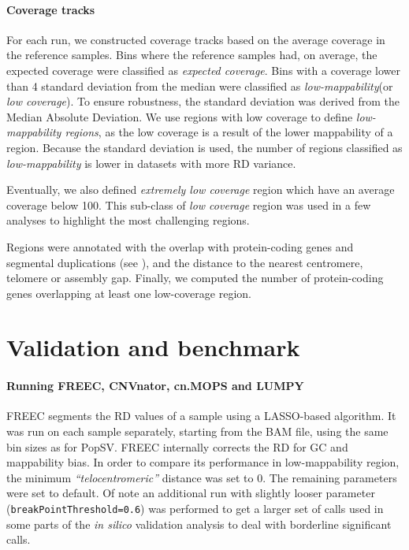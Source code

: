 \paragraph{Coverage tracks}
For each run, we constructed coverage tracks based on the average coverage in the reference samples.
Bins where the reference samples had, on average, the expected coverage were classified as {\it expected coverage}.
Bins with a coverage lower than 4 standard deviation from the median were classified as {\it low-mappability}(or {\it low coverage}).
To ensure robustness, the standard deviation was derived from the Median Absolute Deviation.
We use regions with low coverage to define {\it low-mappability regions}, as the low coverage is a result of the lower mappability of a region.
Because the standard deviation is used, the number of regions classified as {\it low-mappability} is lower in datasets with more RD variance.

Eventually, we also defined {\it extremely low coverage} region which have an average coverage below 100.
This sub-class of {\it low coverage} region was used in a few analyses to highlight the most challenging regions.

Regions were annotated with the overlap with protein-coding genes and segmental duplications (see ), and the distance to the nearest centromere, telomere or assembly gap.
Finally, we computed the number of protein-coding genes overlapping at least one low-coverage region.

\section*{Validation and benchmark}

\paragraph{Running {\sf FREEC}, {\sf CNVnator}, {\sf cn.MOPS} and {\sf LUMPY}}
{\sf FREEC}\cite{Boeva2011} segments the RD values of a sample using a LASSO-based algorithm.
It was run on each sample separately, starting from the BAM file, using the same bin sizes as for {\sf PopSV}.
{\sf FREEC} internally corrects the RD for GC and mappability bias.
In order to compare its performance in low-mappability region, the minimum {\it ``telocentromeric''} distance was set to 0.
The remaining parameters were set to default.
Of note an additional run with slightly looser parameter (\verb!breakPointThreshold=0.6!) was performed to get a larger set of calls used in some parts of the {\it in silico} validation analysis to deal with borderline significant calls.


